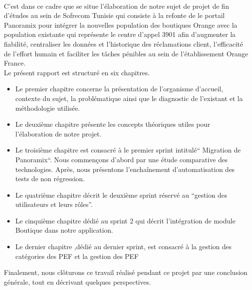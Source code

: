 \\\newline
C’est dans ce cadre que se situe l’élaboration de notre sujet de projet de fin d’études au sein de Sofrecom Tunisie qui consiste à la refonte de le portail Panoramix pour intégrer la nouvelles population des boutiques Orange avec la population existante qui représente le centre d’appel 3901 afin d’augmenter la fiabilité, centraliser les données et l'historique des réclamations client, l’efficacité de l’effort humain et faciliter les tâches pénibles au sein de l’établissement Orange France.\\ \newline
Le présent rapport est structuré en six chapitres.
\begin{itemize}
	\item Le premier chapitre concerne la présentation de l'organisme d’accueil, contexte du sujet, la problématique ainsi que le diagnostic de l’existant et la méthodologie utilisée.
	\item Le deuxième chapitre présente les concepts théoriques utiles pour l’élaboration de notre projet.
	\item Le troisième chapitre est consacré à le premier sprint intitulé“ Migration de Panoramix“. Nous commençons d’abord par une étude comparative des technologies. Après, nous présentons l'enchaînement d’automatisation des tests de non régression.
	\item Le quatrième chapitre décrit le deuxième sprint réservé au “gestion des utilisateurs et leurs rôles”.
	\item Le  cinquième chapitre  dédié au sprint 2 qui décrit l’intégration de module Boutique dans notre application.
	\item Le dernier chapitre ,dédié au dernier sprint, est consacré à la gestion des catégories des PEF et la gestion des PEF
\end{itemize}
Finalement, nous clôturons ce travail réalisé pendant ce projet par une conclusion générale, tout en décrivant quelques perspectives.
